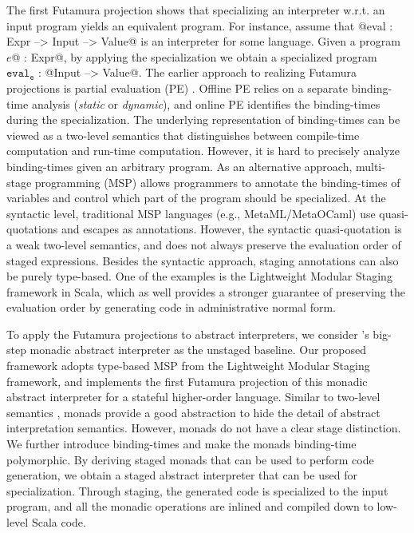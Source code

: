 The first Futamura projection shows that specializing an interpreter w.r.t. an
input program yields an equivalent program. For instance, assume that 
@eval : Expr --> Input --> Value@ is an interpreter for some language.
Given a program $e$@ : Expr@, by applying the specialization we
obtain a specialized program $\texttt{eval}_{\texttt{e}}$ : @Input --> Value@.
The earlier approach to realizing Futamura projections is partial
evaluation (PE) \cite{DBLP:books/daglib/0072559}.
Offline PE relies on a separate binding-time analysis (\textit{static} or
\textit{dynamic}), and online PE identifies the binding-times during the
specialization.
The underlying representation of binding-times can be viewed as a
two-level semantics \cite{NIELSON1989117, NIELSON198859,
Nielson:1992:TFL:130665} that distinguishes between compile-time computation
and run-time computation.  However, it is hard to precisely analyze
binding-times given an arbitrary program. As an alternative approach,
multi-stage programming (MSP) \cite{taha1999multi, DBLP:conf/pepm/TahaS97}
allows programmers to annotate the binding-times of variables and control which
part of the program should be specialized.
At the syntactic level, traditional MSP languages (e.g., MetaML/MetaOCaml) use
quasi-quotations and escapes as annotations. However, the syntactic
quasi-quotation is a weak two-level semantics, and does not always preserve the
evaluation order of staged expressions.
Besides the syntactic approach, staging annotations can also be purely
type-based.  One of the examples is the Lightweight Modular Staging framework
\cite{DBLP:conf/gpce/RompfO10} in Scala, which as well provides a stronger
guarantee of preserving the evaluation order by generating code in
administrative normal form.

To apply the Futamura projections to abstract interpreters, we consider
\citet{DBLP:journals/pacmpl/DaraisLNH17}'s big-step monadic abstract
interpreter as the unstaged baseline.  Our proposed framework adopts type-based
MSP from the Lightweight Modular Staging framework, and implements the first
Futamura projection of this monadic abstract interpreter for a stateful
higher-order language. 
Similar to two-level semantics \cite{NIELSON1989117}, monads provide a good
abstraction to hide the detail of abstract interpretation semantics. However,
monads do not have a clear stage distinction. We further introduce
binding-times and make the monads binding-time polymorphic. 
By deriving staged monads that can be used to perform code generation, we
obtain a staged abstract interpreter that can be used for specialization.
Through staging, the generated code is specialized to the input program, and
all the monadic operations are inlined and compiled down to low-level Scala
code.

